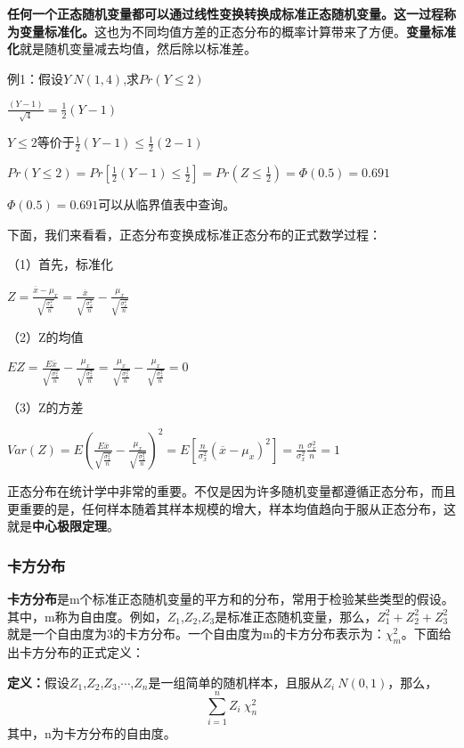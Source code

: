 \documentclass[cn,12pt,math=newtx,citestyle=gb7714-2015,bibstyle=gb7714-2015]{elegantbook}
\begin{document}
	\textbf{任何一个正态随机变量都可以通过线性变换转换成标准正态随机变量。这一过程称为变量标准化。}这也为不同均值方差的正态分布的概率计算带来了方便。\textbf{变量标准化}就是随机变量减去均值，然后除以标准差。
	
	例1：假设$Y~N(1,4)$,求$Pr(Y\le2)$
	
	$\frac{(Y-1)}{\sqrt{4}}=\frac{1}{2}(Y-1)$
	
	$Y\le2$等价于$\frac{1}{2}(Y-1)\le{\frac{1}{2}(2-1)}$
	
	$Pr(Y\le2)=Pr[\frac{1}{2}(Y-1)\le{\frac{1}{2}}]=Pr(Z\le{\frac{1}{2}})=\Phi(0.5)=0.691$
	
	$\Phi(0.5)=0.691$可以从临界值表中查询。
	
	下面，我们来看看，正态分布变换成标准正态分布的正式数学过程：
	
	（1）首先，标准化
	
	$Z=\frac{\overline{x}-\mu_x}{\sqrt{\frac{\sigma_x^2}{n}}}=\frac{\overline{x}}{\sqrt{\frac{\sigma_x^2}{n}}}-\frac{\mu_x}{\sqrt{\frac{\sigma_x^2}{n}}}$
	
	
	
	（2）Z的均值
	
	$EZ=\frac{E\overline{x}}{\sqrt{\frac{\sigma_{x}^{2}}{n}}}-\frac{\mu_x}{\sqrt{\frac{\sigma_{x}^{2}}{n}}}=\frac{\mu_x}{\sqrt{\frac{\sigma_{x}^{2}}{n}}}-\frac{\mu_x}{\sqrt{\frac{\sigma_{x}^{2}}{n}}}=0$
	
	
	
	（3）Z的方差
	
	$Var(Z)=E(\frac{E\overline{x}}{\sqrt{\frac{\sigma_{x}^{2}}{n}}}-\frac{\mu_x}{\sqrt{\frac{\sigma_{x}^{2}}{n}}})^2=E[\frac{n}{\sigma_x^2}(\overline{x}-\mu_x)^2]=\frac{n}{\sigma_x^2}\frac{\sigma_x^2}{n}=1$
	
	正态分布在统计学中非常的重要。不仅是因为许多随机变量都遵循正态分布，而且更重要的是，任何样本随着其样本规模的增大，样本均值趋向于服从正态分布，这就是\textbf{中心极限定理}。
	
	\subsubsection{卡方分布}
	\textbf{卡方分布}是m个标准正态随机变量的平方和的分布，常用于检验某些类型的假设。其中，m称为自由度。例如，$Z_1$,$Z_2$,$Z_3$是标准正态随机变量，那么，$Z_1^2+Z_2^2+Z_3^2$就是一个自由度为3的卡方分布。一个自由度为m的卡方分布表示为：$\chi_m^2$。下面给出卡方分布的正式定义：
	
	\textbf{定义：}假设$Z_1$,$Z_2$,$Z_3$,$\cdots$,$Z_n$是一组简单的随机样本，且服从$Z_i~N(0,1)$，那么，
	\begin{equation}
		\sum_{i=1}^n{Z_i}~\chi_n^2
	\end{equation}
	其中，n为卡方分布的自由度。
	
\end{document}

